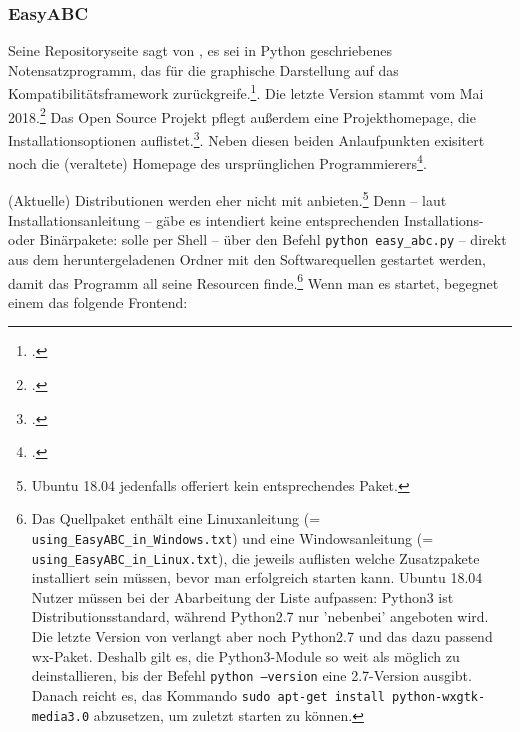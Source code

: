 %
%
%



\subsubsection{EasyABC}

Seine Repositoryseite sagt von , es sei in Python geschriebenes
Notensatzprogramm, das für die graphische Darstellung auf das
Kompatibilitätsframework  zurückgreife.\footcite[vgl.][\nopage
wp]{EasyAbc2017a}. Die letzte Version stammt vom Mai
2018.\footcite[vgl.][\nopage wp]{EasyAbc2017c} Das Open Source Projekt pflegt
außerdem eine Projekthomepage, die Installationsoptionen
auflistet.\footcite[vgl.][\nopage wp]{EasyAbc2017b}. Neben diesen beiden
Anlaufpunkten exisitert noch die (veraltete) Homepage des ursprünglichen
Programmierers\footcite[vgl.][\nopage wp]{Liberg2015a}.

(Aktuelle) Distributionen werden  eher nicht mit
anbieten.\footnote{Ubuntu 18.04 jedenfalls offeriert kein entsprechendes Paket.}
Denn -- laut  Installationsanleitung -- gäbe es intendiert keine
entsprechenden Installations- oder Binärpakete:  solle per Shell --
über den Befehl \texttt{python easy\_abc.py} -- direkt aus dem heruntergeladenen
Ordner mit den Softwarequellen gestartet werden, damit das Programm all seine
Resourcen finde.\footnote{Das Quellpaket enthält eine Linuxanleitung (=
\texttt{using\_EasyABC\_in\_Windows.txt}) und eine Windowsanleitung (=
\texttt{using\_EasyABC\_in\_Linux.txt}), die jeweils auflisten welche
Zusatzpakete installiert sein müssen, bevor man  erfolgreich
starten kann. Ubuntu 18.04 Nutzer müssen bei der Abarbeitung der Liste
aufpassen: Python3 ist Distributionsstandard, während Python2.7 nur 'nebenbei'
angeboten wird. Die letzte Version von  verlangt aber noch
Python2.7 und das dazu passend wx-Paket. Deshalb gilt es, die Python3-Module so
weit als möglich zu deinstallieren, bis der Befehl \texttt{python --version}
eine 2.7-Version ausgibt. Danach reicht es, das Kommando \texttt{sudo apt-get
install python-wxgtk-media3.0} abzusetzen, um zuletzt  starten zu
können.} Wenn man es startet, begegnet einem das folgende Frontend:

